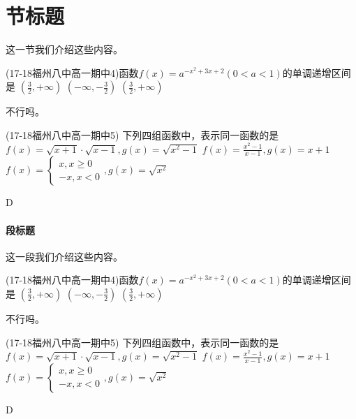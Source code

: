 \documentclass[12pt,UTF8]{ctexart}
\begin{document}
\section{节标题}这一节我们介绍这些内容。
\begin{exercise}
\item (17-18福州八中高一期中4)函数$f(x)=a^{-x^2+3x+2}(0<a<1)$的单调递增区间是\xz
        {$(\frac32,+\infty)$}
        {$(-\infty,-\frac32)$}
        {$(\frac32,+\infty)$}
\begin{answer}
不行吗。
\end{answer}
\item  (17-18福州八中高一期中5) 下列四组函数中，表示同一函数的是\xz
        {$f(x)=\sqrt{x+1}\cdot\sqrt{x-1},g(x)=\sqrt{x^2-1}$}
        {$f(x)=\frac{x^2-1}{x-1},g(x)=x+1$}
        {$f(x)=\begin{cases}x,x\geq0\\-x,x<0\end{cases},g(x)=\sqrt{x^2}$}
\begin{answer}
D
\end{answer}
\end{exercise}
\paragraph{段标题}这一段我们介绍这些内容。
\begin{exercise}
\item (17-18福州八中高一期中4)函数$f(x)=a^{-x^2+3x+2}(0<a<1)$的单调递增区间是\xz
        {$(\frac32,+\infty)$}
        {$(-\infty,-\frac32)$}
        {$(\frac32,+\infty)$}
\begin{answer}
不行吗。
\end{answer}
\item  (17-18福州八中高一期中5) 下列四组函数中，表示同一函数的是\xz
        {$f(x)=\sqrt{x+1}\cdot\sqrt{x-1},g(x)=\sqrt{x^2-1}$}
        {$f(x)=\frac{x^2-1}{x-1},g(x)=x+1$}
        {$f(x)=\begin{cases}x,x\geq0\\-x,x<0\end{cases},g(x)=\sqrt{x^2}$}
\begin{answer}
D
\end{answer}
\end{exercise}
\startexercise


\vspace{1em}

\vspace{2em}

\vspace{2em}
\end{document}
